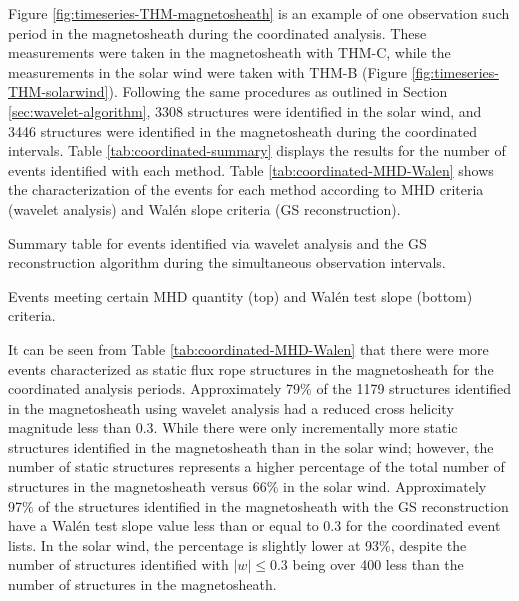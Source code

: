 Figure \ref{fig:timeseries-THM-magnetosheath} is an example of one observation such period in the magnetosheath during the coordinated analysis. These measurements were taken in the magnetosheath with THM-C, while the measurements in the solar wind were taken with THM-B (Figure \ref{fig:timeseries-THM-solarwind}). Following the same procedures as outlined in Section \ref{sec:wavelet-algorithm}, 3308 structures were identified in the solar wind, and 3446 structures were identified in the magnetosheath during the coordinated intervals. Table \ref{tab:coordinated-summary} displays the results for the number of events identified with each method. Table \ref{tab:coordinated-MHD-Walen} shows the characterization of the events for each method according to MHD criteria (wavelet analysis) and Wal\'en slope criteria (GS reconstruction).

\begin{table}
    \centering
    \caption{Summary table for events identified via wavelet analysis and the GS reconstruction algorithm during the simultaneous observation intervals.}
    
    \label{tab:coordinated-summary}
\end{table}

\begin{table}
    \centering
    \caption{Events meeting certain MHD quantity (top) and Wal\'en test slope (bottom) criteria.}
    
    \label{tab:coordinated-MHD-Walen}
\end{table}

\noindent It can be seen from Table \ref{tab:coordinated-MHD-Walen} that there were more events characterized as static flux rope structures in the magnetosheath for the coordinated analysis periods. Approximately 79\% of the 1179 structures identified in the magnetosheath using wavelet analysis had a reduced cross helicity magnitude less than 0.3. While there were only incrementally more static structures identified in the magnetosheath than in the solar wind; however, the number of static structures represents a higher percentage of the total number of structures in the magnetosheath versus 66\% in the solar wind. Approximately 97\% of the structures identified in the magnetosheath with the GS reconstruction have a Wal\'en test slope value less than or equal to 0.3 for the coordinated event lists. In the solar wind, the percentage is slightly lower at 93\%, despite the number of structures identified with $|w|\leq 0.3$ being over 400 less than the number of structures in the magnetosheath.


